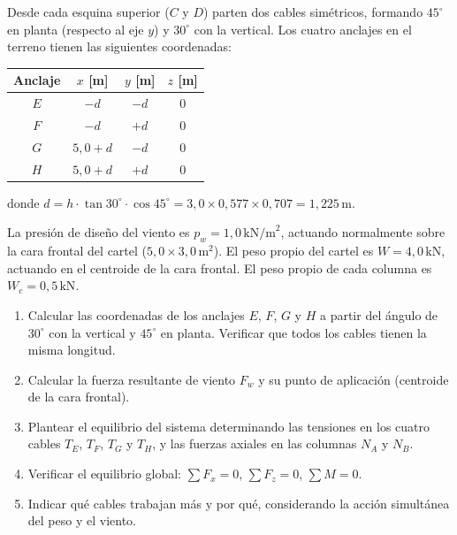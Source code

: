 \documentclass[11pt,a4paper]{article}
\begin{document}
Desde cada esquina superior ($C$ y $D$) parten dos cables simétricos,
formando $45^\circ$ en planta (respecto al eje $y$) y $30^\circ$ con
la vertical. Los cuatro anclajes en el terreno tienen las siguientes
coordenadas:

\begin{center}
\begin{tabular}{cccc}
\hline
\textbf{Anclaje} & $x$ [m] & $y$ [m] & $z$ [m] \\
\hline
$E$ & $-d$ & $-d$ & 0 \\
$F$ & $-d$ & $+d$ & 0 \\
$G$ & $5{,}0+d$ & $-d$ & 0 \\
$H$ & $5{,}0+d$ & $+d$ & 0 \\
\hline
\end{tabular}
\end{center}

donde $d = h \cdot \tan30^\circ \cdot \cos45^\circ =
3{,}0 \times 0{,}577 \times 0{,}707 = 1{,}225\,\text{m}$.

La presión de diseño del viento es $p_w = 1{,}0\,\text{kN/m}^2$,
actuando normalmente sobre la cara frontal del cartel
($5{,}0 \times 3{,}0\,\text{m}^2$).
El peso propio del cartel es $W = 4{,}0\,\text{kN}$, actuando
en el centroide de la cara frontal.
El peso propio de cada columna es $W_c = 0{,}5\,\text{kN}$.

\begin{enumerate}[label=\alph*)]
    \item Calcular las coordenadas de los anclajes $E$, $F$, $G$ y $H$
    a partir del ángulo de $30^\circ$ con la vertical y $45^\circ$
    en planta. Verificar que todos los cables tienen la misma longitud.
    \item Calcular la fuerza resultante de viento $F_w$ y su punto
    de aplicación (centroide de la cara frontal).
    \item Plantear el equilibrio del sistema determinando las tensiones
    en los cuatro cables $T_E$, $T_F$, $T_G$ y $T_H$, y las fuerzas
    axiales en las columnas $N_A$ y $N_B$.
    \item Verificar el equilibrio global:
    $\sum F_x = 0$, $\sum F_z = 0$, $\sum M = 0$.
    \item Indicar qué cables trabajan más y por qué, considerando
    la acción simultánea del peso y el viento.
\end{enumerate}
\end{document}
